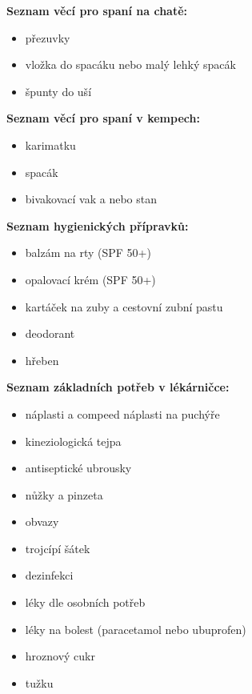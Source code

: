 \noindent\textbf{Seznam věcí pro spaní na chatě:}
\begin{itemize}
    \item přezuvky
    \item vložka do spacáku nebo malý lehký spacák
    \item špunty do uší
\end{itemize}

\noindent\textbf{Seznam věcí pro spaní v kempech:}
\begin{itemize}
    \item karimatku
    \item spacák
    \item bivakovací vak a nebo stan
\end{itemize}

\noindent\textbf{Seznam hygienických přípravků:}
\begin{itemize}
    \item balzám na rty (SPF 50+)
    \item opalovací krém (SPF 50+)
    \item kartáček na zuby a cestovní zubní pastu
    \item deodorant
    \item hřeben
\end{itemize}

\noindent\textbf{Seznam základních potřeb v lékárničce:}
\begin{itemize}
    \item náplasti a compeed náplasti na puchýře
    \item kineziologická tejpa
    \item antiseptické ubrousky
    \item nůžky a pinzeta
    \item obvazy
    \item trojcípí šátek
    \item dezinfekci
    \item léky dle osobních potřeb
    \item léky na bolest (paracetamol nebo ubuprofen)
    \item hroznový cukr
    \item tužku
\end{itemize}
